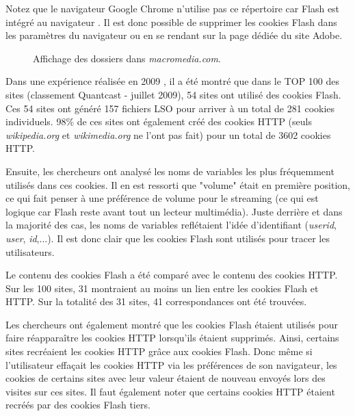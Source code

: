Notez que le navigateur Google Chrome n'utilise pas ce répertoire car Flash est intégré au navigateur \cite{flash_chrome}. Il est donc possible de supprimer les cookies Flash dans les paramètres du navigateur ou en se rendant sur la page dédiée du site Adobe.
\newline

\begin{figure}[h]
	\centering
	
	\caption{\label{ls_macromedia.com}Affichage des dossiers dans \textit{macromedia.com}.}
\end{figure}

Dans une expérience réalisée en 2009 \cite{conf/aaaiss/SoltaniCMTH10}, il a été montré que dans le TOP 100 des sites (classement Quantcast - juillet 2009), 54 sites ont utilisé des cookies Flash. Ces 54 sites ont généré 157 fichiers LSO pour arriver à un total de 281 cookies individuels. 98\% de ces sites ont également créé des cookies HTTP (seuls \textit{wikipedia.org} et \textit{wikimedia.org} ne l'ont pas fait) pour un total de 3602 cookies HTTP.
\newline

Ensuite, les chercheurs ont analysé les noms de variables les plus fréquemment utilisés dans ces cookies. Il en est ressorti que "volume" était en première position, ce qui fait penser à une préférence de volume pour le streaming (ce qui est logique car Flash reste avant tout un lecteur multimédia). Juste derrière et dans la majorité des cas, les noms de variables reflétaient l'idée d'identifiant (\textit{userid}, \textit{user}, \textit{id},...). Il est donc clair que les cookies Flash sont utilisés pour tracer les utilisateurs.
\newline

Le contenu des cookies Flash a été comparé avec le contenu des cookies HTTP. Sur les 100 sites, 31 montraient au moins un lien entre les cookies Flash et HTTP. Sur la totalité des 31 sites, 41 correspondances ont été trouvées.
\newline

Les chercheurs ont également montré que les cookies Flash étaient utilisés pour faire réapparaître les cookies HTTP lorsqu'ils étaient supprimés. Ainsi, certains sites recréaient les cookies HTTP grâce aux cookies Flash. Donc même si l'utilisateur effaçait les cookies HTTP via les préférences de son navigateur, les cookies de certains sites avec leur valeur étaient de nouveau envoyés lors des visites sur ces sites. Il faut également noter que certains cookies HTTP étaient recréés par des cookies Flash tiers.
\newline
\newpage

